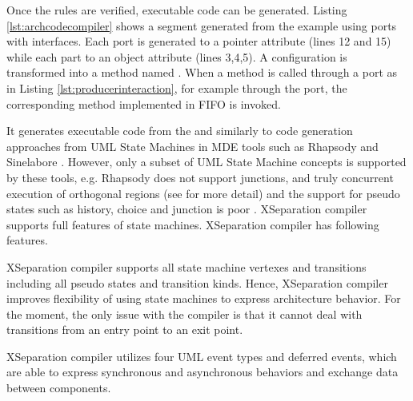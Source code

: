 Once the rules are verified, executable code can be generated. 
Listing \ref{lst:archcodecompiler} shows a  segment generated from the  example using ports with interfaces.
Each port is generated to a pointer attribute (lines 12 and 15) while each part to an object attribute (lines 3,4,5).
A configuration is transformed into a method named .
When a method is called through a port as in Listing \ref{lst:producerinteraction}, for example  through the  port, the corresponding method implemented in FIFO is invoked. 

\begin{minipage}{\columnwidth}
	
\end{minipage} 

\vskip 0.1cm
\noindent
{}
It generates executable code from the  and  similarly to code generation approaches from UML State Machines in MDE tools such as Rhapsody and Sinelabore \cite{sinelabore}.
However, only a subset of UML State Machine concepts is supported by these tools, e.g. Rhapsody does not support junctions, and truly concurrent execution of orthogonal regions
\cite{ibmdiff} (see \cite{specification_uml_2007} for more detail) and the support for pseudo states such as history, choice and junction is poor \cite{EA, sinelabore}. 
XSeparation compiler supports full features of state machines.
XSeparation compiler has following features.

\vskip 0.1cm
\noindent
{} XSeparation compiler supports all state machine vertexes and transitions including all pseudo states and transition kinds. 
Hence, XSeparation compiler improves flexibility of using state machines to express architecture behavior.
For the moment, the only issue with the compiler is that it cannot deal with transitions from an entry point to an exit point.

\vskip 0.1cm
\noindent	
{} XSeparation compiler utilizes four UML event types and deferred events, which are able to express synchronous and asynchronous behaviors and exchange data between components.
	
